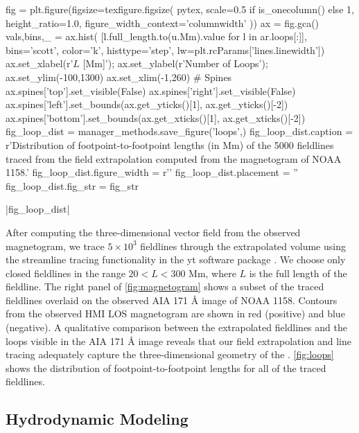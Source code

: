 \begin{pycode}
fig = plt.figure(figsize=texfigure.figsize(
    pytex,
    scale=0.5 if is_onecolumn() else 1,
    height_ratio=1.0,
    figure_width_context='columnwidth'
))
ax = fig.gca()
vals,bins,_ = ax.hist(
    [l.full_length.to(u.Mm).value for l in ar.loops[:]],
    bins='scott', color='k', histtype='step', lw=plt.rcParams['lines.linewidth'])
ax.set_xlabel(r'$L$ [Mm]');
ax.set_ylabel(r'Number of Loops');
ax.set_ylim(-100,1300)
ax.set_xlim(-1,260)
# Spines
ax.spines['top'].set_visible(False)
ax.spines['right'].set_visible(False)
ax.spines['left'].set_bounds(ax.get_yticks()[1], ax.get_yticks()[-2])
ax.spines['bottom'].set_bounds(ax.get_xticks()[1], ax.get_xticks()[-2])
fig_loop_dist = manager_methods.save_figure('loops',)
fig_loop_dist.caption = r'Distribution of footpoint-to-footpoint lengths (in Mm) of the 5000 fieldlines traced from the field extrapolation computed from the magnetogram of NOAA 1158.'
fig_loop_dist.figure_width = r'\columnwidth'
fig_loop_dist.placement = ''
fig_loop_dist.fig_str = fig_str
\end{pycode}
|fig_loop_dist|

After computing the three-dimensional vector field from the observed magnetogram, we trace $5\times10^3$ fieldlines through the extrapolated volume using the streamline tracing functionality in the yt software package \citep{turk_yt_2011}. We choose only closed fieldlines in the range $20<L<300$ Mm, where $L$ is the full length of the fieldline. The right panel of \autoref{fig:magnetogram} shows a subset of the traced fieldlines overlaid on the observed AIA 171 \AA{} image of NOAA 1158. Contours from the observed HMI LOS magnetogram are shown in red (positive) and blue (negative). A qualitative comparison between the extrapolated fieldlines and the loops visible in the AIA 171 \AA{} image reveals that our field extrapolation and line tracing adequately capture the three-dimensional geometry of the \AR{}. \autoref{fig:loops} shows the distribution of footpoint-to-footpoint lengths for all of the traced fieldlines.

\subsection{Hydrodynamic Modeling}\label{loops}

